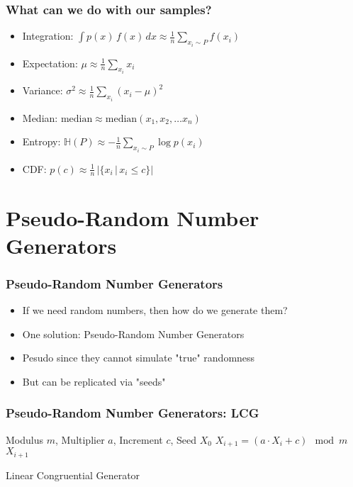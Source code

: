 \documentclass{beamer}
\begin{document}


\begin{frame}
\frametitle{What can we do with our samples?}
\begin{itemize}
  \item Integration: $\int p(x) \, f(x) \, dx \approx \frac{1}{n} \sum_{x_i \sim P} f(x_i) $
  \item Expectation: $ \mu \approx \frac{1}{n} \sum_{x_i} x_i $
  \item Variance: $ \sigma^2 \approx \frac{1}{n} \sum_{x_i} \left( x_i - \mu \right)^2$
  \item Median: $\text{median} \approx \text{median} (x_1, x_2, \hdots x_n)$
  \item Entropy: $\mathbb{H}(P) \approx - \frac{1}{n} \sum_{x_i \sim P} \log p (x_i)$
  \item CDF: $p(c) \approx \frac{1}{n} \, \vert \{ x_i \, | \, x_i \leq c \} \vert$
\end{itemize}
\end{frame}




\section{Pseudo-Random Number Generators}
\begin{frame}
\frametitle{Pseudo-Random Number Generators}
\begin{itemize}
  \item If we need random numbers, then how do we generate them?
  \item One solution: Pseudo-Random Number Generators
  \item Pesudo since they cannot simulate "true" randomness
  \item But can be replicated via "seeds"
\end{itemize}
\end{frame}


\begin{frame}
\frametitle{Pseudo-Random Number Generators: LCG}
\begin{algorithm}[H]
\begin{algorithmic}[1]
  \REQUIRE Modulus $m$, Multiplier $a$, Increment $c$, Seed $X_0$
  \STATE $X_{i+1} = \left( a \cdot X_i + c \right) \mod m$
  \ENSURE $X_{i+1}$
\end{algorithmic}
\caption{Linear Congruential Generator}
\end{algorithm}
\end{frame}
\end{document}

